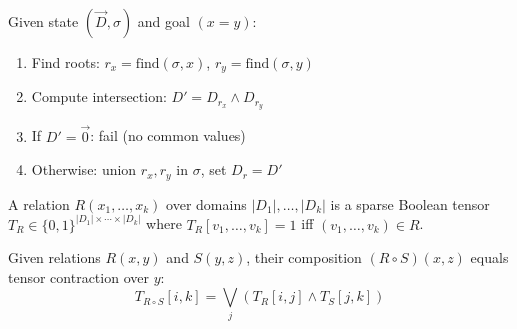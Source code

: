\begin{theorem}
\label{thm:unify-and}
Given state $(\vec{D}, \sigma)$ and goal $(x = y)$:
\begin{enumerate}
  \item Find roots: $r_x = \text{find}(\sigma, x)$, $r_y = \text{find}(\sigma, y)$
  \item Compute intersection: $D' = D_{r_x} \land D_{r_y}$
  \item If $D' = \vec{0}$: fail (no common values)
  \item Otherwise: union $r_x, r_y$ in $\sigma$, set $D_{r} = D'$
\end{enumerate}
\end{theorem}

\begin{theorem}
\label{thm:relation-tensor}
A relation $R(x_1, \ldots, x_k)$ over domains $|D_1|, \ldots, |D_k|$ is a
sparse Boolean tensor $T_R \in \{0,1\}^{|D_1| \times \cdots \times |D_k|}$
where $T_R[v_1, \ldots, v_k] = 1$ iff $(v_1, \ldots, v_k) \in R$.
\end{theorem}

\begin{theorem}
\label{thm:composition-contraction}
Given relations $R(x, y)$ and $S(y, z)$, their composition $(R \circ S)(x, z)$
equals tensor contraction over $y$:
\[
T_{R \circ S}[i, k] = \bigvee_j (T_R[i, j] \land T_S[j, k])
\]
\end{theorem}


\newcommand{\scopeclarification}{%
\textbf{Scope Clarification.}
This paper addresses the \emph{Finite-Domain miniKanren Kernel} (\fdmk),
where variable domains are finite bitmasks.
Standard miniKanren unification over unbounded term structures uses a separate
reference implementation; the bit-parallel approach accelerates the constraint
propagation core, not full structural unification.
}


\newcommand{\dom}[1]{D_{#1}}          %
\newcommand{\domand}{\land}            %
\newcommand{\domor}{\lor}              %

